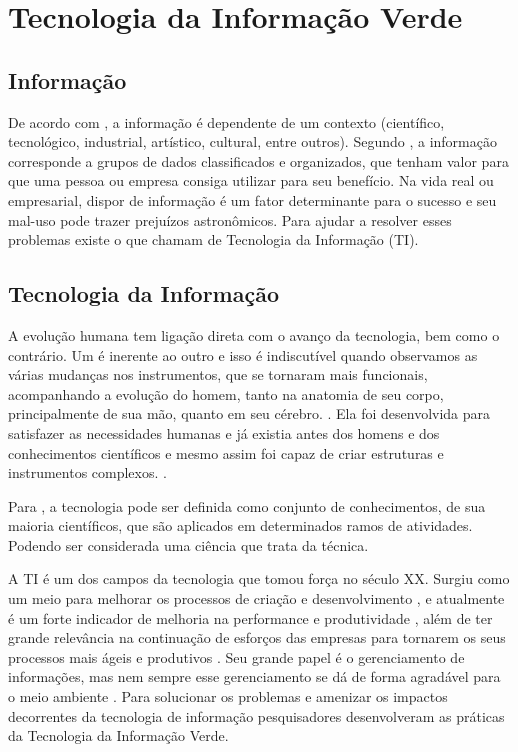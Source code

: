 %
%

\chapter{Tecnologia da Informação Verde}

\section{Informação}

De acordo com , a informação é dependente de um contexto (científico, tecnológico, industrial, artístico, cultural, entre outros). Segundo , a informação corresponde a grupos de dados classificados e organizados, que tenham valor para que uma pessoa ou empresa consiga utilizar para seu benefício. Na vida real ou empresarial, dispor de informação é um fator determinante para o sucesso e seu mal-uso pode trazer prejuízos astronômicos. Para ajudar a resolver esses problemas existe o que chamam de Tecnologia da Informação (TI).

\section{Tecnologia da Informação}

A evolução humana tem ligação direta com o avanço da tecnologia, bem como o contrário. Um é inerente ao outro e isso é indiscutível quando observamos as várias mudanças nos instrumentos, que se tornaram mais funcionais, acompanhando a evolução do homem, tanto na anatomia de seu corpo, principalmente de sua mão, quanto em seu cérebro. \cite[p. 107-111]{acevedo1998ciencia}. Ela foi desenvolvida para satisfazer as necessidades humanas e já existia antes dos homens e dos conhecimentos científicos e mesmo assim foi capaz de criar estruturas e instrumentos complexos. \cite{acevedo1998ciencia, veraszto2004projeto}. 

Para , a tecnologia pode ser definida como conjunto de conhecimentos, de sua maioria científicos, que são aplicados em determinados ramos de atividades. Podendo ser considerada uma ciência que trata da técnica.

A TI é um dos campos da tecnologia que tomou força no século XX. Surgiu como um meio para melhorar os processos de criação e desenvolvimento \cite[p. 2]{de1996tecnologia}, e atualmente é um forte indicador de melhoria na performance e produtividade \cite[p. 2]{lunardi2001efeitos}, além de ter grande relevância na continuação de esforços das empresas para tornarem os seus processos mais ágeis e produtivos \cite{shaw1997information}. Seu grande papel é o gerenciamento de informações, mas nem sempre esse gerenciamento se dá de forma agradável para o meio ambiente \cite[p. 6-7]{silva2011}. Para solucionar os problemas e amenizar os impactos decorrentes da tecnologia de informação pesquisadores desenvolveram as práticas da Tecnologia da Informação Verde.

